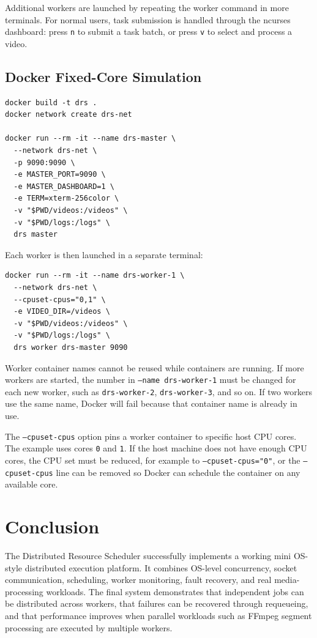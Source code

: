 \documentclass[12pt,a4paper]{article}
\begin{document}
Additional workers are launched by repeating the worker command in more terminals. For normal users, task submission is handled through the ncurses dashboard: press \texttt{n} to submit a task batch, or press \texttt{v} to select and process a video.

\subsection{Docker Fixed-Core Simulation}

\begin{lstlisting}[style=shellstyle]
docker build -t drs .
docker network create drs-net

docker run --rm -it --name drs-master \
  --network drs-net \
  -p 9090:9090 \
  -e MASTER_PORT=9090 \
  -e MASTER_DASHBOARD=1 \
  -e TERM=xterm-256color \
  -v "$PWD/videos:/videos" \
  -v "$PWD/logs:/logs" \
  drs master
\end{lstlisting}

Each worker is then launched in a separate terminal:

\begin{lstlisting}[style=shellstyle]
docker run --rm -it --name drs-worker-1 \
  --network drs-net \
  --cpuset-cpus="0,1" \
  -e VIDEO_DIR=/videos \
  -v "$PWD/videos:/videos" \
  -v "$PWD/logs:/logs" \
  drs worker drs-master 9090
\end{lstlisting}

Worker container names cannot be reused while containers are running. If more workers are started, the number in \texttt{--name drs-worker-1} must be changed for each new worker, such as \texttt{drs-worker-2}, \texttt{drs-worker-3}, and so on. If two workers use the same name, Docker will fail because that container name is already in use.

The \texttt{--cpuset-cpus} option pins a worker container to specific host CPU cores. The example uses cores \texttt{0} and \texttt{1}. If the host machine does not have enough CPU cores, the CPU set must be reduced, for example to \texttt{--cpuset-cpus="0"}, or the \texttt{--cpuset-cpus} line can be removed so Docker can schedule the container on any available core.

\section{Conclusion}

The Distributed Resource Scheduler successfully implements a working mini OS-style distributed execution platform. It combines OS-level concurrency, socket communication, scheduling, worker monitoring, fault recovery, and real media-processing workloads. The final system demonstrates that independent jobs can be distributed across workers, that failures can be recovered through requeueing, and that performance improves when parallel workloads such as FFmpeg segment processing are executed by multiple workers.
\end{document}
